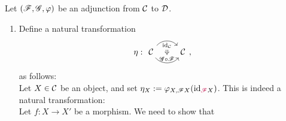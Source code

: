 \begin{rem}
 Let $(\mathscr{F},\mathscr{G},\varphi)$ be an adjunction from $\mathcal{C}$ to $\mathcal{D}$.
 \begin{enumerate}
     \item Define a natural transformation
     \[
     \eta: \begin{tikzcd}
\ccat \arrow[r, bend left=50, "\id_{\ccat}"{name=U, below}]
\arrow[r, bend right=50, "\gfunc \circ \ffunc"{name=D}]
&\ccat
\arrow[Rightarrow, from=U, to=D]
\end{tikzcd},\] as follows:\\
Let $X\in \mathcal{C}$ be an object, and set $\eta_{X}:= \varphi_{X,\mathscr{F} X}(\operatorname{id}_{\color{purple} \mathscr{F}\color{black} X})$. This is indeed a natural transformation:\\
Let $f:X\to X'$ be a morphism. We need to show that 
 \end{enumerate}

\end{rem}